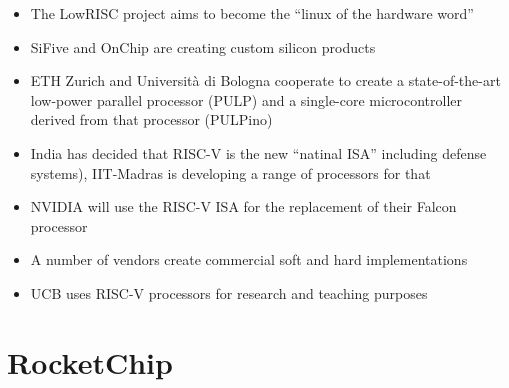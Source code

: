 \documentclass[journal,a4paper]{IEEEtran}
\begin{document}

\begin{itemize}
	\item The LowRISC project aims to become the ``linux of the hardware word''\cite{lowrisc}
	\item SiFive\cite{sifive} and OnChip are creating custom silicon products\cite{open-v}
	\item ETH Zurich and Università di Bologna cooperate to create a state-of-the-art low-power parallel processor (PULP) and a single-core microcontroller derived from that processor (PULPino)\cite{pulp}
	\item India has decided that RISC-V is the new ``natinal ISA'' including defense systems\cite[Time: 46:55]{riscv-vid}), IIT-Madras is developing a range of processors for that\cite{iit-madras}
	\item NVIDIA will use the RISC-V ISA for the replacement of their Falcon processor\cite{nvidia}
	\item A number of vendors create commercial soft and hard implementations\cite{riscv-commercial} %
	\item UCB uses RISC-V processors for research\cite{ucb-science} and teaching purposes\cite{sodor}
\end{itemize}

\section{RocketChip}
\end{document}
